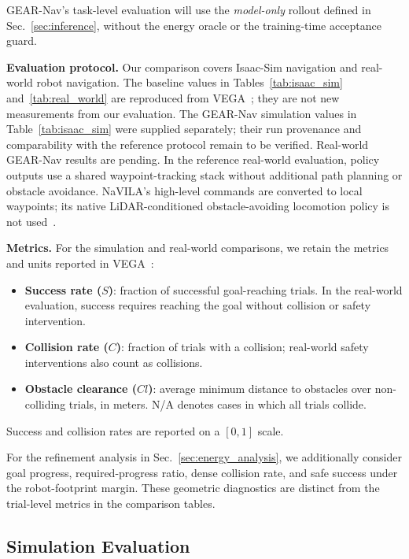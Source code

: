 \documentclass[letterpaper, 10 pt, conference]{ieeeconf}  %
\begin{document}
GEAR-Nav's task-level evaluation will use the \emph{model-only} rollout
defined in Sec.~\ref{sec:inference}, without the energy oracle or the
training-time acceptance guard.

\textbf{Evaluation protocol.}
Our comparison covers Isaac-Sim navigation and real-world robot navigation.
The baseline values in Tables~\ref{tab:isaac_sim} and~\ref{tab:real_world}
are reproduced from VEGA~\cite{vega}; they are not new measurements from
our evaluation. The GEAR-Nav simulation values in Table~\ref{tab:isaac_sim}
were supplied separately; their run provenance and comparability with the
reference protocol remain to be verified. Real-world GEAR-Nav results are
pending. In the reference real-world evaluation,
policy outputs use a shared waypoint-tracking stack without additional path
planning or obstacle avoidance. NaVILA's high-level commands are converted
to local waypoints; its native LiDAR-conditioned obstacle-avoiding locomotion
policy is not used~\cite{vega}.

\textbf{Metrics.}
For the simulation and real-world comparisons, we retain the metrics and
units reported in VEGA~\cite{vega}:
\begin{itemize}
    \item \textbf{Success rate ($S$)}: fraction of successful goal-reaching
    trials. In the real-world evaluation, success requires reaching the goal
    without collision or safety intervention.
    \item \textbf{Collision rate ($C$)}: fraction of trials with a collision;
    real-world safety interventions also count as collisions.
    \item \textbf{Obstacle clearance ($Cl$)}: average minimum distance to
    obstacles over non-colliding trials, in meters. N/A denotes cases in
    which all trials collide.
\end{itemize}
Success and collision rates are reported on a $[0,1]$ scale.

For the refinement analysis in Sec.~\ref{sec:energy_analysis}, we additionally
consider goal progress, required-progress ratio, dense collision rate, and
safe success under the robot-footprint margin. These geometric diagnostics
are distinct from the trial-level metrics in the comparison tables.

\subsection{Simulation Evaluation}
\label{sec:simulation}
\end{document}
